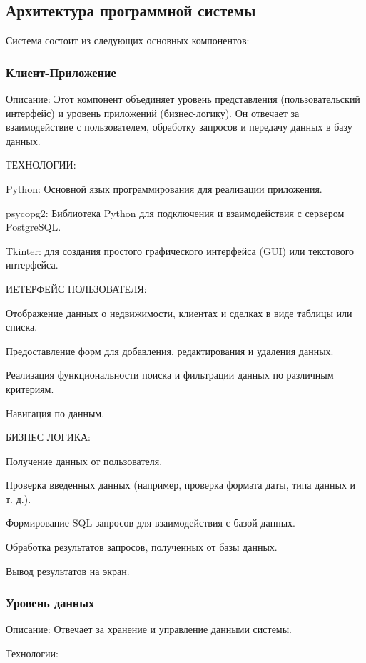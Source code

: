 \subsection{Архитектура программной системы}

Система состоит из следующих основных компонентов:

\subsubsection{Клиент-Приложение}

Описание: Этот компонент объединяет уровень представления (пользовательский интерфейс) и уровень приложений (бизнес-логику). Он отвечает за взаимодействие с пользователем, обработку запросов и передачу данных в базу данных.

ТЕХНОЛОГИИ:

Python: Основной язык программирования для реализации приложения.

psycopg2: Библиотека Python для подключения и взаимодействия с сервером PostgreSQL.

Tkinter: для создания простого графического интерфейса (GUI) или текстового интерфейса. 

ИЕТЕРФЕЙС ПОЛЬЗОВАТЕЛЯ:

Отображение данных о недвижимости, клиентах и сделках в виде таблицы или списка.

Предоставление форм для добавления, редактирования и удаления данных.

Реализация функциональности поиска и фильтрации данных по различным критериям.

Навигация по данным.

БИЗНЕС ЛОГИКА:

Получение данных от пользователя.

Проверка введенных данных (например, проверка формата даты, типа данных и т. д.).

Формирование SQL-запросов для взаимодействия с базой данных.

Обработка результатов запросов, полученных от базы данных.

Вывод результатов на экран.

\subsubsection{Уровень данных}

Описание: Отвечает за хранение и управление данными системы.

Технологии:


